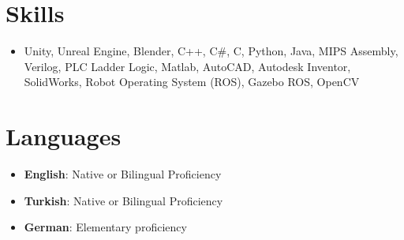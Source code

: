 \documentclass[letterpaper,11pt]{article}
\newcommand{\resumeSkillSimple}[1]{
  \item \small{#1}
}
\newcommand{\resumeSkillExperience}[2]{
  \item \small{\textbf{#1}: #2} \vspace{-10pt}
}
\newcommand{\resumeLanguage}[2]{
  \item
    \textbf{#1}: #2 \vspace{-10pt}
}
\newcommand{\resumeSubHeadingListStart}{\begin{itemize}[leftmargin=0.0in, label={}]}
\newcommand{\resumeSubHeadingListEnd}{\end{itemize}}
\begin{document}
\section{Skills}
\begin{itemize}[leftmargin=0.15in, label={}]
  \resumeSkillSimple{Unity, Unreal Engine, Blender, C++, C\#, C, Python, Java, MIPS Assembly, Verilog, PLC Ladder Logic, Matlab, AutoCAD, Autodesk Inventor, SolidWorks, Robot Operating System (ROS), Gazebo ROS, OpenCV}
\end{itemize}
\vspace{-20pt}


\section{Languages}
  \resumeSubHeadingListStart
    \resumeLanguage
      {English}{Native or Bilingual Proficiency}
    \resumeLanguage
      {Turkish}{Native or Bilingual Proficiency}
    \resumeLanguage
      {German}{Elementary proficiency}
  \resumeSubHeadingListEnd
\vspace{-10pt}
\end{document}
